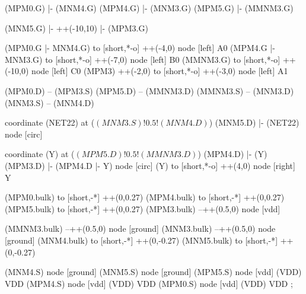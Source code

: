 \begin{circuitikz}[american]
	(MPM0.G) |- (MNM4.G)
	(MPM4.G) |- (MNM3.G)
	(MPM5.G) |- (MMNM3.G)
	
	(MNM5.G) |- ++(-10,10) |- (MPM3.G)
	
	(MPM0.G |- MNM4.G) to [short,*-o] ++(-4,0) node [left] {A0}
	(MPM4.G |- MNM3.G) to [short,*-o] ++(-7,0) node [left] {B0}
	(MMNM3.G) to [short,*-o] ++(-10,0) node [left] {C0}
	(MPM3) ++(-2,0) to [short,*-o] ++(-3,0) node [left] {A1}
	
	(MPM0.D) -- (MPM3.S)
	(MPM5.D) -- (MMNM3.D)
	(MMNM3.S) -- (MNM3.D)
	(MNM3.S) -- (MNM4.D)
	
	coordinate (NET22) at ($(MNM3.S)!0.5!(MNM4.D)$)
	(MNM5.D) |- (NET22) node [circ] {}
	
	coordinate (Y) at ($(MPM5.D)!0.5!(MMNM3.D)$)
	(MPM4.D) |- (Y)
	(MPM3.D) |- (MPM4.D |- Y) node [circ] {}
	(Y) to [short,*-o] ++(4,0) node [right] {Y}
	
	(MPM0.bulk) to [short,-*] ++(0,0.27)
	(MPM4.bulk) to [short,-*] ++(0,0.27)	
	(MPM5.bulk) to [short,-*] ++(0,0.27)	
	(MPM3.bulk) --++(0.5,0) node [vdd]{}
	
	(MMNM3.bulk) --++(0.5,0) node [ground]{}
	(MNM3.bulk) --++(0.5,0) node [ground]{}
	(MNM4.bulk) to [short,-*] ++(0,-0.27) 
	(MNM5.bulk) to [short,-*] ++(0,-0.27)


	(MNM4.S) node [ground] {}
	(MNM5.S) node [ground] {}
	(MPM5.S) node [vdd] (VDD) {VDD}
	(MPM4.S) node [vdd] (VDD) {VDD}
	(MPM0.S) node [vdd] (VDD) {VDD}
;

\end{circuitikz}
